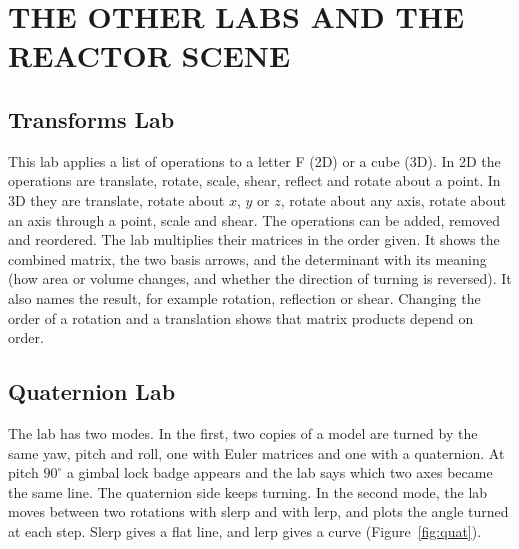 \chapter{THE OTHER LABS AND THE REACTOR SCENE}\nonum

\section{Transforms Lab}
This lab applies a list of operations to a letter F (2D) or a cube (3D). In 2D the operations are translate, rotate, scale, shear, reflect and rotate about a point. In 3D they are translate, rotate about $x$, $y$ or $z$, rotate about any axis, rotate about an axis through a point, scale and shear. The operations can be added, removed and reordered. The lab multiplies their matrices in the order given. It shows the combined matrix, the two basis arrows, and the determinant with its meaning (how area or volume changes, and whether the direction of turning is reversed). It also names the result, for example rotation, reflection or shear. Changing the order of a rotation and a translation shows that matrix products depend on order.


\section{Quaternion Lab}
The lab has two modes. In the first, two copies of a model are turned by the same yaw, pitch and roll, one with Euler matrices and one with a quaternion. At pitch $90^\circ$ a gimbal lock badge appears and the lab says which two axes became the same line. The quaternion side keeps turning. In the second mode, the lab moves between two rotations with slerp and with lerp, and plots the angle turned at each step. Slerp gives a flat line, and lerp gives a curve (Figure~\ref{fig:quat}).


